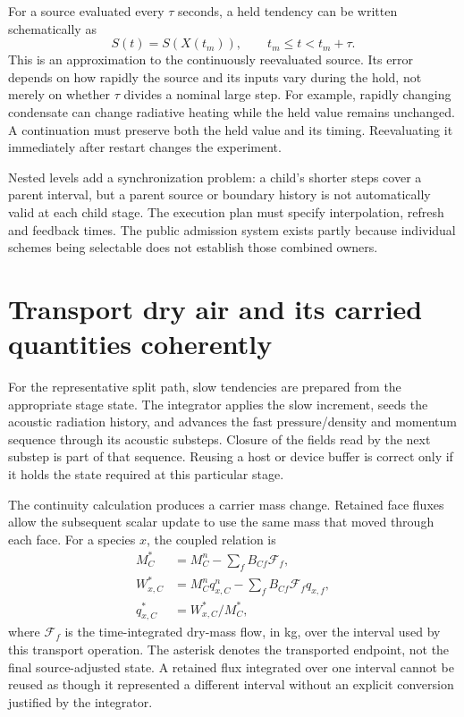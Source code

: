 For a source evaluated every $\tau$ seconds, a held tendency can be written
schematically as
\[
 S(t)=S(X(t_m)),\qquad t_m\le t<t_m+\tau.
\]
This is an approximation to the continuously reevaluated source. Its error
depends on how rapidly the source and its inputs vary during the hold, not
merely on whether $\tau$ divides a nominal large step. For example, rapidly
changing condensate can change radiative heating while the held value remains
unchanged. A continuation must preserve both the held value and its timing.
Reevaluating it immediately after restart changes the experiment.

Nested levels add a synchronization problem: a child's shorter steps cover a
parent interval, but a parent source or boundary history is not automatically
valid at each child stage. The execution plan must specify interpolation,
refresh and feedback times. The public admission system exists partly because
individual schemes being selectable does not establish those combined owners.

\section{Transport dry air and its carried quantities coherently}

For the representative split path, slow tendencies are prepared from the
appropriate stage state. The integrator applies the slow increment, seeds the
acoustic radiation history, and advances the fast pressure/density and momentum
sequence through its acoustic substeps. Closure of the fields read by the next
substep is part of that sequence. Reusing a host or device buffer is correct
only if it holds the state required at this particular stage.

The continuity calculation produces a carrier mass change. Retained face fluxes
allow the subsequent scalar update to use the same mass that moved through each
face. For a species $x$, the coupled relation is
\[
 \begin{aligned}
 M_C^*&=M_C^n-\sum_f B_{Cf}\mathcal F_f,\\
 W_{x,C}^*&=M_C^n q_{x,C}^n-\sum_fB_{Cf}\mathcal F_f q_{x,f},\\
 q_{x,C}^*&=W_{x,C}^*/M_C^*,
 \end{aligned}
\]
where $\mathcal F_f$ is the time-integrated dry-mass flow, in kg, over the
interval used by this transport operation. The asterisk denotes the transported
endpoint, not the final source-adjusted state. A retained flux integrated over
one interval cannot be reused as though it represented a different interval
without an explicit conversion justified by the integrator.

